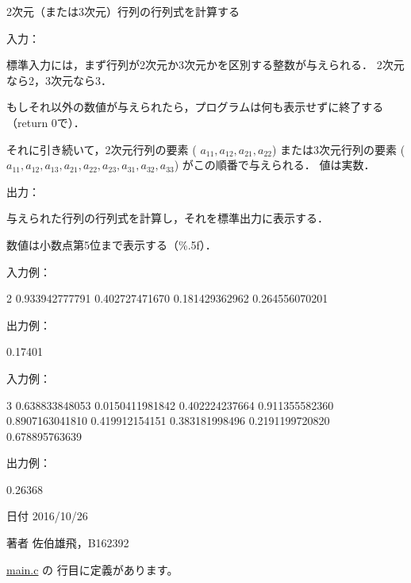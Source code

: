 2次元（または3次元）行列の行列式を計算する 

入力：
\begin{DoxyItemize}
\item 標準入力には，まず行列が2次元か3次元かを区別する整数が与えられる． 2次元なら2，3次元なら3．
\end{DoxyItemize}

もしそれ以外の数値が与えられたら，プログラムは何も表示せずに終了する（return 0で）．
\begin{DoxyItemize}
\item それに引き続いて，2次元行列の要素 ( $ a_{11},a_{12},a_{21},a_{22} $) または3次元行列の要素 ( $ a_{11},a_{12},a_{13},a_{21},a_{22},a_{23},a_{31},a_{32},a_{33}$) がこの順番で与えられる． 値は実数．
\end{DoxyItemize}

出力：
\begin{DoxyItemize}
\item 与えられた行列の行列式を計算し，それを標準出力に表示する．
\item 数値は小数点第5位まで表示する（\%.5f）．
\end{DoxyItemize}

入力例： \begin{DoxyVerb}2
0.933942777791 0.402727471670
0.181429362962 0.264556070201
\end{DoxyVerb}
 出力例： \begin{DoxyVerb}0.17401
\end{DoxyVerb}
 入力例： \begin{DoxyVerb}3
0.638833848053 0.0150411981842 0.402224237664
0.911355582360 0.8907163041810 0.419912154151
0.383181998496 0.2191199720820 0.678895763639
\end{DoxyVerb}
 出力例： \begin{DoxyVerb}0.26368
\end{DoxyVerb}
 \begin{DoxyDate}{日付}
2016/10/26 
\end{DoxyDate}
\begin{DoxyAuthor}{著者}
佐伯雄飛，\-B162392 
\end{DoxyAuthor}


 \hyperlink{main_8c_source}{main.\-c} の  行目に定義があります。


